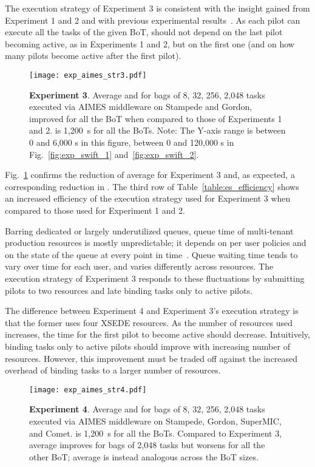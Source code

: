 \documentclass[10pt, conference, compsocconf]{IEEEtran}
\newcommand{\B}[1]{\textbf{#1}\xspace}
\begin{document}
The execution strategy of Experiment 3 is consistent with the insight gained
from Experiment 1 and 2 and with previous experimental
results~\cite{turilli2016integrating}. As each pilot can execute all the
tasks of the given BoT,  should not depend on the last pilot becoming
active, as in Experiments 1 and 2, but on the first one (and on how many
pilots become active after the first pilot).

\begin{figure}
  \centering
  \texttt{[image: exp\_aimes\_str3.pdf]}
  \caption{\B{Experiment 3}. Average  and  for bags of
           8, 32, 256, 2,048 tasks executed via AIMES middleware on Stampede
           and Gordon, improved for all the BoT when compared to those of
           Experiments 1 and 2.  is 1,200~s for all the BoTs. Note:
           The Y-axis range is between 0 and 6,000 s in this figure, between
           0 and 120,000 s in Fig.~\ref{fig:exp_swift_1}
           and~\ref{fig:exp_swift_2}.}\label{fig:exp_aimes_3}
\end{figure}

Fig.~\ref{fig:exp_aimes_3} confirms the reduction of average  for
Experiment 3 and, as expected, a corresponding reduction in . The
third row of Table~\ref{table:es_efficiency} shows an increased efficiency of
the execution strategy used for Experiment 3 when compared to those used for
Experiment 1 and 2.

Barring dedicated or largely underutilized queues, queue time of multi-tenant
production resources  is mostly unpredictable; it depends on per user
policies and on the state of the queue at every point in
time~\cite{wolski2003experiences}. Queue waiting time tends to vary over time
for each user, and varies differently across resources. The execution
strategy of Experiment 3 responds to these fluctuations by submitting pilots
to two resources and late binding tasks only to active pilots.

The difference between Experiment 4 and Experiment 3's execution strategy is
that the former uses four XSEDE resources.  As the number of resources used
increases, the time for the first pilot to become active should decrease.
Intuitively, binding tasks only to active pilots should improve with
increasing number of resources. However, this improvement must be traded off
against the increased overhead of binding tasks to a larger number of
resources.

\begin{figure}
  \centering
  \texttt{[image: exp\_aimes\_str4.pdf]}
  \caption{ \B{Experiment 4}. Average  and  for bags of 8, 32,
            256, 2,048 tasks executed via AIMES middleware on Stampede,
            Gordon, SuperMIC, and Comet.  is 1,200~s for all the
            BoTs. Compared to Experiment 3, average  improves for bags
            of 2,048 tasks but worsens for all the other BoT\@; average
             is instead analogous across the BoT
            sizes.\label{fig:exp_aimes_4}}
\end{figure}
\end{document}

